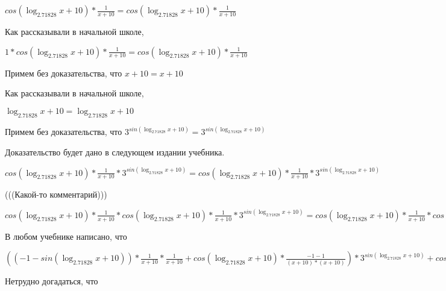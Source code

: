 \documentclass[12pt,a4paper,fleqn]{article}
\theoremstyle{definition}
\begin{document}
$cos(\log_{ 2.71828 }{ x  +  10 }) * \frac{ 1 }{ x  +  10 }
 = cos(\log_{ 2.71828 }{ x  +  10 }) * \frac{ 1 }{ x  +  10 }
$

Как рассказывали в начальной школе,

$ 1  * cos(\log_{ 2.71828 }{ x  +  10 }) * \frac{ 1 }{ x  +  10 }
 = cos(\log_{ 2.71828 }{ x  +  10 }) * \frac{ 1 }{ x  +  10 }
$

Примем без доказательства, что
$ x  +  10  =  x  +  10 $

Как рассказывали в начальной школе,

$\log_{ 2.71828 }{ x  +  10 } = \log_{ 2.71828 }{ x  +  10 }$

Примем без доказательства, что
${ 3 }^{sin(\log_{ 2.71828 }{ x  +  10 })} = { 3 }^{sin(\log_{ 2.71828 }{ x  +  10 })}$

Доказательство будет дано в следующем издании учебника.

$cos(\log_{ 2.71828 }{ x  +  10 }) * \frac{ 1 }{ x  +  10 }
 * { 3 }^{sin(\log_{ 2.71828 }{ x  +  10 })} = cos(\log_{ 2.71828 }{ x  +  10 }) * \frac{ 1 }{ x  +  10 }
 * { 3 }^{sin(\log_{ 2.71828 }{ x  +  10 })}$

(((Какой-то комментарий)))

$cos(\log_{ 2.71828 }{ x  +  10 }) * \frac{ 1 }{ x  +  10 }
 * cos(\log_{ 2.71828 }{ x  +  10 }) * \frac{ 1 }{ x  +  10 }
 * { 3 }^{sin(\log_{ 2.71828 }{ x  +  10 })} = cos(\log_{ 2.71828 }{ x  +  10 }) * \frac{ 1 }{ x  +  10 }
 * cos(\log_{ 2.71828 }{ x  +  10 }) * \frac{ 1 }{ x  +  10 }
 * { 3 }^{sin(\log_{ 2.71828 }{ x  +  10 })}$

В любом учебнике написано, что

$(( -1  - sin(\log_{ 2.71828 }{ x  +  10 })) * \frac{ 1 }{ x  +  10 }
 * \frac{ 1 }{ x  +  10 }
 + cos(\log_{ 2.71828 }{ x  +  10 }) * \frac{ -1  -  1 }{( x  +  10 ) * ( x  +  10 )}
) * { 3 }^{sin(\log_{ 2.71828 }{ x  +  10 })} + cos(\log_{ 2.71828 }{ x  +  10 }) * \frac{ 1 }{ x  +  10 }
 * cos(\log_{ 2.71828 }{ x  +  10 }) * \frac{ 1 }{ x  +  10 }
 * { 3 }^{sin(\log_{ 2.71828 }{ x  +  10 })} = (( -1  - sin(\log_{ 2.71828 }{ x  +  10 })) * \frac{ 1 }{ x  +  10 }
 * \frac{ 1 }{ x  +  10 }
 + cos(\log_{ 2.71828 }{ x  +  10 }) * \frac{ -1  -  1 }{( x  +  10 ) * ( x  +  10 )}
) * { 3 }^{sin(\log_{ 2.71828 }{ x  +  10 })} + cos(\log_{ 2.71828 }{ x  +  10 }) * \frac{ 1 }{ x  +  10 }
 * cos(\log_{ 2.71828 }{ x  +  10 }) * \frac{ 1 }{ x  +  10 }
 * { 3 }^{sin(\log_{ 2.71828 }{ x  +  10 })}$

Нетрудно догадаться, что
\end{document}
